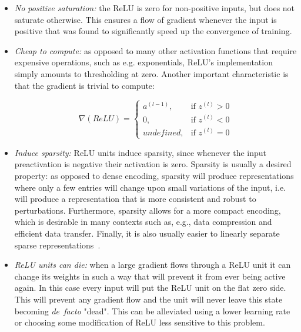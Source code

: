 \begin{itemize}
    \item \emph{No positive saturation:} the ReLU is zero for non-positive
        inputs, but does not saturate otherwise. This ensures a flow of
        gradient whenever the input is positive that was found to significantly
        speed up the convergence of training.
    \item \emph{Cheap to compute:} as opposed to many other activation
        functions that require expensive operations, such as e.g. exponentials,
        ReLU's implementation simply amounts to thresholding at zero. Another
        important characteristic is that the gradient is trivial to compute:

        \begin{equation*}
            \nabla (ReLU) =
                \begin{cases}
                    a^{(l-1)},  & \text{if } z^{(l)} > 0 \\
                    0,          & \text{if } z^{(l)} < 0 \\
                    undefined,  & \text{if } z^{(l)} = 0
                \end{cases}
        \end{equation*}

    \item \emph{Induce sparsity:} ReLU units induce sparsity, since whenever
        the input preactivation is negative their activation is zero. Sparsity
        is usually a desired property: as opposed to dense encoding, sparsity
        will produce representations where only a few entries will change
        upon small variations of the input, i.e. will produce a representation
        that is more consistent and robust to perturbations. Furthermore,
        sparsity allows for a more compact encoding, which is desirable in many
        contexts such as, e.g., data compression and efficient data transfer.
        Finally, it is also usually easier to linearly separate sparse
        representations~\citep{Glorot+al-AI-2011-small}.
    \item \emph{ReLU units can die:} when a large gradient flows through a ReLU
        unit it can change its weights in such a way that will prevent it from
        ever being active again. In this case every input will put the ReLU
        unit on the flat zero side. This will prevent any gradient flow and the
        unit will never leave this state becoming \emph{de~facto} "dead". This
        can be alleviated using a lower learning rate or choosing some
        modification of ReLU less sensitive to this problem.
\end{itemize}

